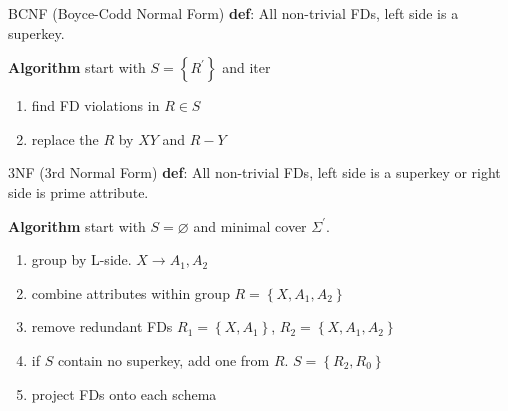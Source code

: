 \documentclass[a4paper]{article}
\begin{document}
\begin{cheatsheetblock}{BCNF (Boyce-Codd Normal Form)}
    \textbf{def}: All non-trivial FDs, left side is a superkey.

    \textbf{Algorithm} start with $S = \left\{R^\prime\right\}$ and iter
    \begin{enumerate}
        \item find FD violations in $R \in S$
        \item replace the $R$ by $XY$ and $R-Y$
    \end{enumerate}
\end{cheatsheetblock}

\begin{cheatsheetblock}{3NF (3rd Normal Form)}
    \textbf{def}: All non-trivial FDs, left side is a superkey or right side is prime attribute.

    \textbf{Algorithm} start with $S = \varnothing$ and minimal cover $\Sigma^\prime$.
    \begin{enumerate}
        \item group by L-side. \hfill $X \rightarrow A_1, A_2$
        \item combine attributes within group \hfill $R = \left\{X, A_1, A_2\right\}$
        \item remove redundant FDs \hfill \sout{$R_1 = \left\{X, A_1\right\}$}, $R_2 = \left\{X, A_1, A_2\right\}$
        \item if $S$ contain no superkey, add one from $R$. \hfill $S = \left\{R_2, R_0\right\}$
        \item project FDs onto each schema
    \end{enumerate}
\end{cheatsheetblock}












\end{document}
